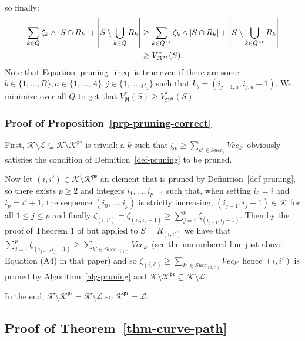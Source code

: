 \documentclass[
  11pt,
  a4paper,
]{article}
\theoremstyle{plain}
\theoremstyle{definition}
\theoremstyle{plain}
\theoremstyle{definition}
\theoremstyle{plain}
\theoremstyle{remark}
\begin{document}
so finally: \begin{align}
\sum_{k\in Q}\zeta_k\wedge|S\cap R_k|+\left| S\setminus\bigcup_{k\in Q} R_k   \right| &\geq \sum_{k\in Q^{\mathfrak{pr}}}\zeta_k\wedge|S\cap R_k|+\left| S\setminus\bigcup_{k\in Q^{\mathfrak{pr}}} R_k   \right|   \label{pruning_ineq}\\
&\geq V^*_{\mathfrak{R}^{\mathfrak{pr}}}(S). \notag
\end{align} Note that Equation \eqref{pruning_ineq} is true even if
there are some
\(b\in\{ 1,\dotsc,B\}, a\in\{ 1,\dotsc,A\}, j\in\{ 1,\dotsc,p_a\}\) such
that \(k_b=(i_{j-1,a}, i_{j,a}-1)\). We minimize over all \(Q\) to get
that
\(V^*_{\mathfrak{R}}(S)\geq V^*_{\mathfrak{R}^{\mathfrak{pr}}}(S)\).

\subsubsection{\texorpdfstring{Proof of
Proposition~\ref{prp-pruning-correct}}{Proof of Proposition~}}\label{sec-pruning-proofs-pruning-correct}

First,
\(\mathcal{K}\setminus\mathcal{L}\subseteq\mathcal{K}\setminus\mathcal{K}^{\mathfrak{pr}}\)
is trivial: a \(k\) such that
\(\zeta_{k} \geq  \sum_{k'\in Succ_k} Vec_{k'}\) obviously satisfies the
condition of Definition~\ref{def-pruning} to be pruned.

Now let \((i,i')\in \mathcal{K}\setminus\mathcal{K}^{\mathfrak{pr}}\) an
element that is pruned by Definition~\ref{def-pruning}, so there exists
\(p\geq2\) and integers \(i_1,\dotsc,i_{p-1}\) such that, when setting
\(i_0=i\) and \(i_{p}=i'+1\), the sequence \((i_0,\dotsc,i_{p})\) is
strictly increasing, \((i_{j-1},i_{j}-1)\in\mathcal{K}\) for all
\(1\leq j\leq p\) and finally
\(\zeta_{(i,i')}=\zeta_{(i_0,i_{p}-1)}\geq \sum_{j=1}^{p} \zeta_{(i_{j-1}, i_{j}-1)}\).
Then by the proof of Theorem 1 of \citet{MR4178188} but applied to
\(S=R_{(i,i')}\) we have that
\(\sum_{j=1}^{p} \zeta_{(i_{j-1}, i_{j}-1)}\geq  \sum_{k'\in Succ_{(i,i')}} Vec_{k'}\)
(see the unnumbered line just above Equation (A4) in that paper) and so
\(\zeta_{(i,i')}\geq \sum_{k'\in Succ_{(i,i')}} Vec_{k'}\) hence
\((i,i')\) is pruned by  Algorithm~\ref{alg-pruning}  and
\(\mathcal{K}\setminus\mathcal{K}^{\mathfrak{pr}}\subseteq\mathcal{K}\setminus\mathcal{L}\).

In the end,
\(\mathcal{K}\setminus\mathcal{K}^{\mathfrak{pr}}=\mathcal{K}\setminus\mathcal{L}\)
so \(\mathcal{K}^{\mathfrak{pr}}=\mathcal{L}\).

\subsection{\texorpdfstring{Proof of
Theorem~\ref{thm-curve-path}}{Proof of Theorem~}}\label{sec-proof}
\end{document}
